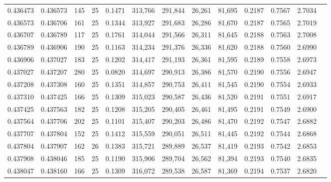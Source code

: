 \begin{tabular}{rrrrrrrrrrrrr}
0.436473 & 0.436573 &   145 &  25 &                                     0.1471 & 313,766 & 291,844 &  26,261 &  81,695 & 0.2187 & 0.7567 & 2.7034 \\
0.436573 & 0.436706 &   161 &  25 &                                     0.1344 & 313,927 & 291,683 &  26,286 &  81,670 & 0.2187 & 0.7565 & 2.7019 \\
0.436707 & 0.436789 &   117 &  25 &                                     0.1761 & 314,044 & 291,566 &  26,311 &  81,645 & 0.2188 & 0.7563 & 2.7008 \\
0.436789 & 0.436906 &   190 &  25 &                                     0.1163 & 314,234 & 291,376 &  26,336 &  81,620 & 0.2188 & 0.7560 & 2.6990 \\
0.436906 & 0.437027 &   183 &  25 &                                     0.1202 & 314,417 & 291,193 &  26,361 &  81,595 & 0.2189 & 0.7558 & 2.6973 \\
0.437027 & 0.437207 &   280 &  25 &                                     0.0820 & 314,697 & 290,913 &  26,386 &  81,570 & 0.2190 & 0.7556 & 2.6947 \\
0.437208 & 0.437308 &   160 &  25 &                                     0.1351 & 314,857 & 290,753 &  26,411 &  81,545 & 0.2190 & 0.7554 & 2.6933 \\
0.437310 & 0.437425 &   166 &  25 &                                     0.1309 & 315,023 & 290,587 &  26,436 &  81,520 & 0.2191 & 0.7551 & 2.6917 \\
0.437425 & 0.437563 &   182 &  25 &                                     0.1208 & 315,205 & 290,405 &  26,461 &  81,495 & 0.2191 & 0.7549 & 2.6900 \\
0.437564 & 0.437706 &   202 &  25 &                                     0.1101 & 315,407 & 290,203 &  26,486 &  81,470 & 0.2192 & 0.7547 & 2.6882 \\
0.437707 & 0.437804 &   152 &  25 &                                     0.1412 & 315,559 & 290,051 &  26,511 &  81,445 & 0.2192 & 0.7544 & 2.6868 \\
0.437804 & 0.437907 &   162 &  26 &                                     0.1383 & 315,721 & 289,889 &  26,537 &  81,419 & 0.2193 & 0.7542 & 2.6853 \\
0.437908 & 0.438046 &   185 &  25 &                                     0.1190 & 315,906 & 289,704 &  26,562 &  81,394 & 0.2193 & 0.7540 & 2.6835 \\
0.438047 & 0.438160 &   166 &  25 &                                     0.1309 & 316,072 & 289,538 &  26,587 &  81,369 & 0.2194 & 0.7537 & 2.6820 \\

\end{tabular}
